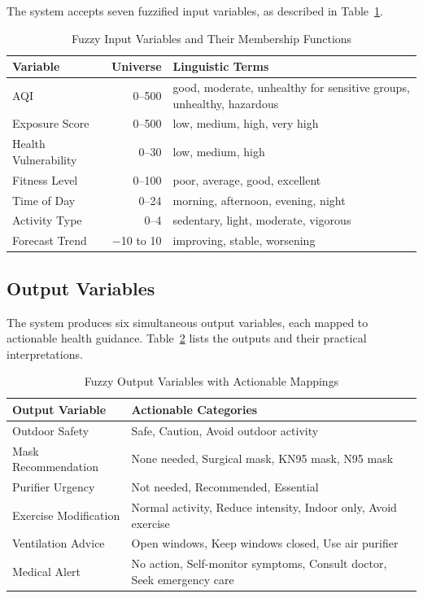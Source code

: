 \documentclass[12pt,a4paper]{report}
\begin{document}
The system accepts seven fuzzified input variables, as described in Table~\ref{tab:fuzzy_inputs}.

\begin{table}[H]
\centering
\caption{Fuzzy Input Variables and Their Membership Functions}
\label{tab:fuzzy_inputs}
\begin{tabularx}{\textwidth}{lrX}
\toprule
\textbf{Variable} & \textbf{Universe} & \textbf{Linguistic Terms} \\
\midrule
AQI                 & 0--500      & good, moderate, unhealthy for sensitive groups, unhealthy, hazardous \\
Exposure Score      & 0--500      & low, medium, high, very high \\
Health Vulnerability& 0--30       & low, medium, high \\
Fitness Level       & 0--100      & poor, average, good, excellent \\
Time of Day         & 0--24       & morning, afternoon, evening, night \\
Activity Type       & 0--4        & sedentary, light, moderate, vigorous \\
Forecast Trend      & $-$10 to 10 & improving, stable, worsening \\
\bottomrule
\end{tabularx}
\end{table}

\subsection{Output Variables}

The system produces six simultaneous output variables, each mapped to actionable health guidance. Table~\ref{tab:fuzzy_outputs} lists the outputs and their practical interpretations.

\begin{table}[H]
\centering
\caption{Fuzzy Output Variables with Actionable Mappings}
\label{tab:fuzzy_outputs}
\begin{tabularx}{\textwidth}{lX}
\toprule
\textbf{Output Variable} & \textbf{Actionable Categories} \\
\midrule
Outdoor Safety        & Safe, Caution, Avoid outdoor activity \\
Mask Recommendation   & None needed, Surgical mask, KN95 mask, N95 mask \\
Purifier Urgency      & Not needed, Recommended, Essential \\
Exercise Modification & Normal activity, Reduce intensity, Indoor only, Avoid exercise \\
Ventilation Advice    & Open windows, Keep windows closed, Use air purifier \\
Medical Alert         & No action, Self-monitor symptoms, Consult doctor, Seek emergency care \\
\bottomrule
\end{tabularx}
\end{table}
\end{document}
